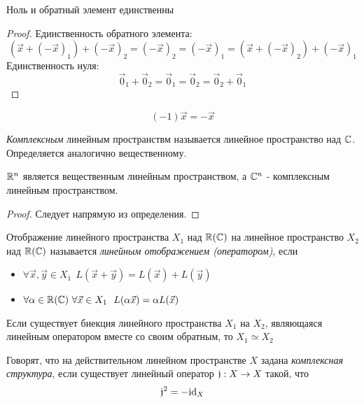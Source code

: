 \begin{proposition}
	Ноль и обратный элемент единственны
\end{proposition}

\begin{proof}
	Единственность обратного элемента:
	\[
		(\vec{x} + (-\vec{x})_1) + (-\vec{x})_2 = (-\vec{x})_2 = (-\vec{x})_1 = (\vec{x} + (-\vec{x})_2) + (-\vec{x})_1
	\]
	Единственность нуля:
	\[
		\vec{0}_1 + \vec{0}_2 = \vec{0}_1 = \vec{0}_2 = \vec{0}_2 + \vec{0}_1
	\]
\end{proof}

\begin{proposition}
	\[
		(-1)\vec{x} = -\vec{x}
	\]
\end{proposition}

\begin{definition}
	\textit{Комплексным} линейным пространствм называется линейное пространство над $\mathbb{C}$. Определяется аналогично вещественному.
\end{definition}

\begin{lemma}
	$\mathbb{R}^n$ является вещественным линейным пространством, а $\mathbb{C}^n$ - комплексным линейным пространством.
\end{lemma}

\begin{proof}
	Следует напрямую из определения.
\end{proof}

\begin{definition}
	Отображение линейного пространства $X_1$ над $\mathbb{R}(\mathbb{C})$ на линейное пространство $X_2$ над $\mathbb{R}(\mathbb{C})$ называется \textit{линейным отображением (оператором)}, если
	\begin{itemize}
		\item $\forall \vec{x}, \vec{y} \in X_1\ \ L(\vec{x} + \vec{y}) = L(\vec{x}) + L(\vec{y})$
		
		\item $\forall \alpha \in \mathbb{R}(\mathbb{C})\ \forall \vec{x} \in X_1\ \ L(\alpha \vec{x}) = \alpha L(\vec{x})$
	\end{itemize}
\end{definition}

\begin{definition}
	Если существует биекция линейного пространства $X_1$ на $X_2$, являющаяся линейным оператором вместе со своим обратным, то $X_1 \simeq X_2$
\end{definition}

\begin{definition}
	Говорят, что на действительном линейном пространстве $X$ задана \textit{комплексная структура}, если существует линейный оператор $\mathfrak{j}: X \to X$ такой, что
	\[
		\mathfrak{j}^2  = -\mathrm{id}_X
	\]
\end{definition}

